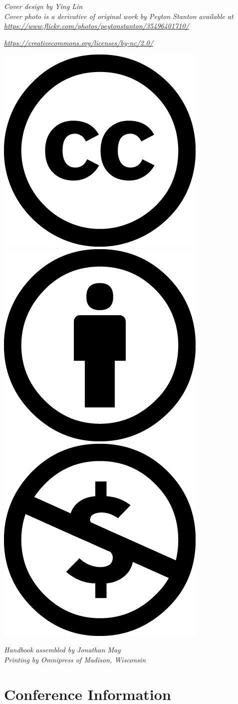 \documentclass[twoside,makeidx]{book}
\begin{document}

\fancyfoot[C]{}


\thispagestyle{empty}
\vspace*{5.5in}
\noindent
\emph{Cover design by Ying Lin}\\

\noindent
\emph{Cover photo is a derivative of original work by Peyton Stanton available at \url{https://www.flickr.com/photos/peytonstanton/35496401710/}}

\noindent
\emph{\url{https://creativecommons.org/licenses/by-nc/2.0/}}

\noindent
\includegraphics[width=.15in]{content/fmatter/cc.png}\includegraphics[width=.15in]{content/fmatter/by.png}\includegraphics[width=.15in]{content/fmatter/nc.png}

\noindent
\emph{Handbook assembled by Jonathan May}\\

\noindent
\emph{Printing by Omnipress of Madison, Wisconsin}

\newpage
\cleardoublepage
\fancyfoot[C]{\thepage}
\frontmatter

\setcounter{tocdepth}{2}
\tableofcontents
\mainmatter
\pagestyle{fancy}

\chapter{Conference Information}


\clearpage


\clearpage%


\clearpage
\setheaders{}{}

\end{document}
